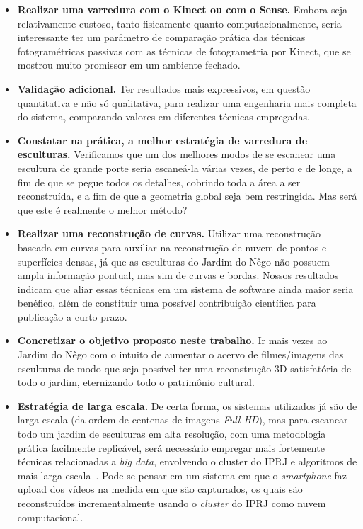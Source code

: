 \begin{itemize}
\item \textbf{Realizar uma varredura com o Kinect ou com o Sense.} Embora seja relativamente
  custoso, tanto fisicamente quanto computacionalmente, seria interessante ter
  um parâmetro de comparação prática das técnicas fotogramétricas passivas com
as técnicas de fotogrametria por Kinect, que se mostrou muito promissor em um
ambiente fechado.  
\item \textbf{Validação adicional.} Ter resultados mais
  expressivos, em questão quantitativa e não só qualitativa, para realizar uma
  engenharia mais completa do sistema, comparando valores em diferentes técnicas
  empregadas.
\item \textbf{Constatar na prática, a melhor estratégia de varredura de
  esculturas.}
Verificamos que um dos melhores modos de se escanear uma escultura de grande
porte seria escaneá-la várias vezes, de perto e de longe, a fim de que se pegue todos os detalhes,
cobrindo toda a área a ser reconstruída, e a fim de que a geometria global seja
bem restringida. Mas será que este é realmente o melhor método?  
\item \textbf{Realizar uma reconstrução de curvas.} 
  Utilizar uma reconstrução baseada em curvas para auxiliar na reconstrução de
  nuvem de pontos e superfícies densas, já que as esculturas do Jardim do Nêgo
  não possuem ampla informação pontual, mas sim de curvas e bordas. Nossos
  resultados indicam que aliar essas técnicas em um sistema de software ainda
  maior seria benéfico, além de constituir uma possível contribuição científica
  para publicação a curto prazo.
\item \textbf{Concretizar o objetivo proposto neste trabalho.} Ir mais vezes
  ao Jardim do Nêgo com o intuito de aumentar o acervo de filmes/imagens das
  esculturas de modo que seja possível ter uma reconstrução 3D satisfatória de
  todo o jardim, eternizando todo o patrimônio cultural.  
\item \textbf{Estratégia de larga escala.} De certa forma, os sistemas
  utilizados já são de
  larga escala (da ordem de centenas de imagens \emph{Full HD}), mas para escanear todo um jardim de esculturas em alta
  resolução, com uma metodologia prática facilmente replicável,
  será necessário empregar mais fortemente técnicas relacionadas a \emph{big data}, envolvendo o cluster do IPRJ
  e algoritmos de mais larga escala~\cite{Argarwal:Snavely:etal:ICCV09}. Pode-se pensar em um sistema em que o
  \emph{smartphone} faz upload dos vídeos na medida em que são capturados, os
  quais são reconstruídos incrementalmente usando o \emph{cluster} do IPRJ como nuvem computacional.
\end{itemize}
